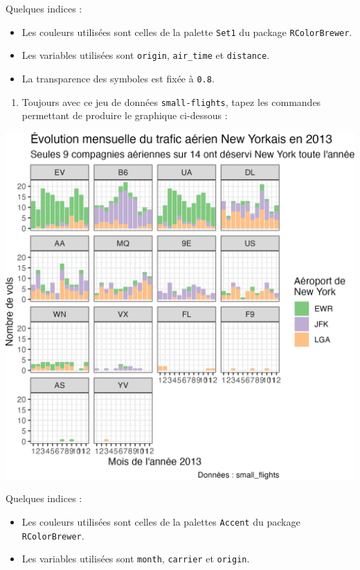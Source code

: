 \documentclass[
  letterpaper,
  DIV=11,
  numbers=noendperiod]{scrreprt}
\providecommand{\tightlist}{%
  \setlength{\itemsep}{0pt}\setlength{\parskip}{0pt}}\usepackage{longtable,booktabs,array}
\begin{document}
Quelques indices :

\begin{itemize}
\tightlist
\item
  Les couleurs utilisées sont celles de la palette \texttt{Set1} du
  package \texttt{RColorBrewer}.
\item
  Les variables utilisées sont \texttt{origin}, \texttt{air\_time} et
  \texttt{distance}.
\item
  La transparence des symboles est fixée à \texttt{0.8}.
\end{itemize}

\begin{enumerate}
\def\labelenumi{\arabic{enumi}.}
\setcounter{enumi}{7}
\tightlist
\item
  Toujours avec ce jeu de données \texttt{small-flights}, tapez les
  commandes permettant de produire le graphique ci-dessous :
\end{enumerate}

\includegraphics{./03-visualization_files/figure-pdf/unnamed-chunk-117-1.png}

Quelques indices :

\begin{itemize}
\tightlist
\item
  Les couleurs utilisées sont celles de la palettes \texttt{Accent} du
  package \texttt{RColorBrewer}.
\item
  Les variables utilisées sont \texttt{month}, \texttt{carrier} et
  \texttt{origin}.
\end{itemize}
\end{document}
